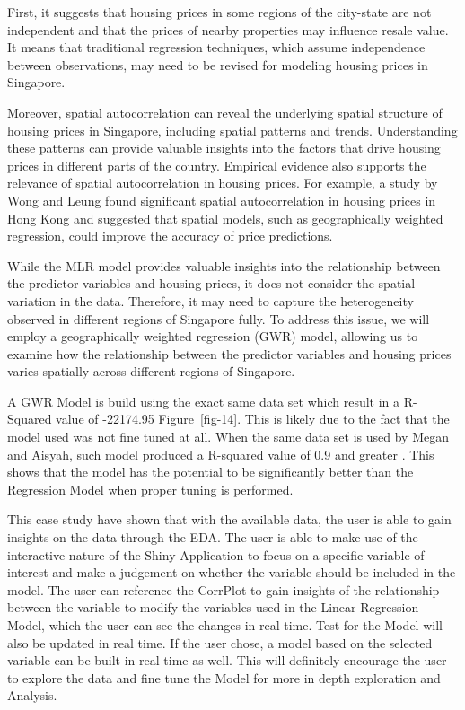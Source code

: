 \documentclass[manuscript,screen]{acmart}
\begin{document}
First, it suggests that housing prices in some regions of the city-state
are not independent and that the prices of nearby properties may
influence resale value. It means that traditional regression techniques,
which assume independence between observations, may need to be revised
for modeling housing prices in Singapore.

Moreover, spatial autocorrelation can reveal the underlying spatial
structure of housing prices in Singapore, including spatial patterns and
trends. Understanding these patterns can provide valuable insights into
the factors that drive housing prices in different parts of the country.
Empirical evidence also supports the relevance of spatial
autocorrelation in housing prices. For example, a study by Wong and
Leung \citep{chunwah2011} found significant spatial autocorrelation in
housing prices in Hong Kong and suggested that spatial models, such as
geographically weighted regression, could improve the accuracy of price
predictions.

While the MLR model provides valuable insights into the relationship
between the predictor variables and housing prices, it does not consider
the spatial variation in the data. Therefore, it may need to capture the
heterogeneity observed in different regions of Singapore fully. To
address this issue, we will employ a geographically weighted regression
(GWR) model, allowing us to examine how the relationship between the
predictor variables and housing prices varies spatially across different
regions of Singapore.

A GWR Model is build using the exact same data set which result in a
R-Squared value of -22174.95 Figure~\ref{fig-14}. This is likely due to
the fact that the model used was not fine tuned at all. When the same
data set is used by Megan and Aisyah, such model produced a R-squared
value of 0.9 and greater \citep{sim23} \citep{Aisyah}. This shows that
the model has the potential to be significantly better than the
Regression Model when proper tuning is performed.

This case study have shown that with the available data, the user is
able to gain insights on the data through the EDA. The user is able to
make use of the interactive nature of the Shiny Application to focus on
a specific variable of interest and make a judgement on whether the
variable should be included in the model. The user can reference the
CorrPlot to gain insights of the relationship between the variable to
modify the variables used in the Linear Regression Model, which the user
can see the changes in real time. Test for the Model will also be
updated in real time. If the user chose, a model based on the selected
variable can be built in real time as well. This will definitely
encourage the user to explore the data and fine tune the Model for more
in depth exploration and Analysis.
\end{document}

